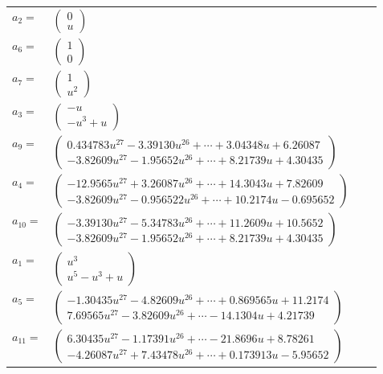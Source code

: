 \documentclass[1p]{elsarticle_modified}
\theoremstyle{definition}
\begin{document}
\begin{tabular}{m{7pt} m{180pt} m{7pt} m{180pt} }
\flushright $a_{2}=$&$\begin{pmatrix}0\\u\end{pmatrix}$ \\
\flushright $a_{6}=$&$\begin{pmatrix}1\\0\end{pmatrix}$ \\
\flushright $a_{7}=$&$\begin{pmatrix}1\\u^2\end{pmatrix}$ \\
\flushright $a_{3}=$&$\begin{pmatrix}- u\\- u^3+u\end{pmatrix}$ \\
\flushright $a_{9}=$&$\begin{pmatrix}0.434783 u^{27}-3.39130 u^{26}+\cdots+3.04348 u+6.26087\\-3.82609 u^{27}-1.95652 u^{26}+\cdots+8.21739 u+4.30435\end{pmatrix}$ \\
\flushright $a_{4}=$&$\begin{pmatrix}-12.9565 u^{27}+3.26087 u^{26}+\cdots+14.3043 u+7.82609\\-3.82609 u^{27}-0.956522 u^{26}+\cdots+10.2174 u-0.695652\end{pmatrix}$ \\
\flushright $a_{10}=$&$\begin{pmatrix}-3.39130 u^{27}-5.34783 u^{26}+\cdots+11.2609 u+10.5652\\-3.82609 u^{27}-1.95652 u^{26}+\cdots+8.21739 u+4.30435\end{pmatrix}$ \\
\flushright $a_{1}=$&$\begin{pmatrix}u^3\\u^5- u^3+u\end{pmatrix}$ \\
\flushright $a_{5}=$&$\begin{pmatrix}-1.30435 u^{27}-4.82609 u^{26}+\cdots+0.869565 u+11.2174\\7.69565 u^{27}-3.82609 u^{26}+\cdots-14.1304 u+4.21739\end{pmatrix}$ \\
\flushright $a_{11}=$&$\begin{pmatrix}6.30435 u^{27}-1.17391 u^{26}+\cdots-21.8696 u+8.78261\\-4.26087 u^{27}+7.43478 u^{26}+\cdots+0.173913 u-5.95652\end{pmatrix}$ \\

\end{tabular}
\end{document}
